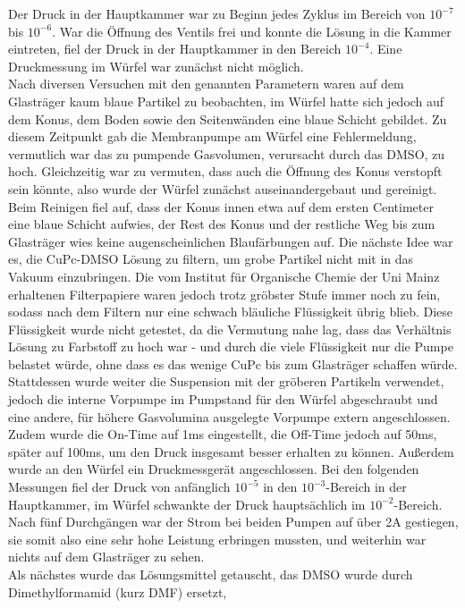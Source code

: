 Der Druck in der Hauptkammer war zu Beginn jedes
Zyklus im Bereich von $10^{-7}$ bis $10^{-6}$.
War die Öffnung des Ventils frei und konnte die
Lösung in die Kammer eintreten, fiel der Druck in
der Hauptkammer in den Bereich $10^{-4}$. Eine
Druckmessung im Würfel war zunächst nicht möglich.\\
Nach diversen Versuchen mit den genannten Parametern waren auf dem Glasträger kaum blaue Partikel zu
beobachten, im Würfel hatte sich jedoch auf dem Konus, dem Boden sowie den Seitenwänden eine blaue Schicht
gebildet. Zu diesem Zeitpunkt gab die Membranpumpe am Würfel eine Fehlermeldung, vermutlich war das
zu pumpende Gasvolumen, verursacht durch das DMSO, zu hoch. Gleichzeitig war zu vermuten, dass auch die
Öffnung des Konus verstopft sein könnte, also wurde der Würfel zunächst auseinandergebaut und gereinigt.\\
Beim Reinigen fiel auf, dass der Konus innen etwa auf dem ersten Centimeter eine blaue Schicht aufwies, der
Rest des Konus und der restliche Weg bis zum Glasträger wies keine augenscheinlichen Blaufärbungen auf. Die
nächste Idee war es, die CuPc-DMSO Lösung zu filtern, um grobe Partikel nicht mit in das Vakuum einzubringen.
Die vom Institut für Organische Chemie der Uni Mainz erhaltenen Filterpapiere waren jedoch  trotz gröbster
Stufe immer noch zu fein, sodass nach dem Filtern nur eine schwach bläuliche Flüssigkeit übrig blieb. Diese
Flüssigkeit wurde nicht getestet, da die Vermutung nahe lag, dass das Verhältnis Lösung zu Farbstoff zu hoch
war - und durch die viele Flüssigkeit nur die Pumpe belastet würde, ohne dass es das wenige CuPc bis zum
Glasträger schaffen würde.\\
Stattdessen wurde weiter die Suspension mit der gröberen Partikeln verwendet, jedoch die interne Vorpumpe im
Pumpstand für den Würfel abgeschraubt und eine andere, für höhere Gasvolumina ausgelegte Vorpumpe extern
angeschlossen. Zudem wurde die On-Time auf 1ms eingestellt, die Off-Time jedoch auf 50ms, später auf 100ms, um
den Druck insgesamt besser erhalten zu können. Außerdem wurde an den Würfel ein Druckmessgerät angeschlossen.
Bei den folgenden Messungen fiel der Druck von anfänglich $10^{-5}$ in den $10^{-3}$-Bereich in der
Hauptkammer, im Würfel schwankte der Druck hauptsächlich im $10^{-2}$-Bereich. Nach fünf Durchgängen war der
Strom bei beiden Pumpen auf über 2A gestiegen, sie somit also eine sehr hohe Leistung erbringen mussten, und
weiterhin war nichts auf dem Glasträger zu sehen.\\
Als nächstes wurde das Lösungsmittel getauscht, das DMSO wurde durch Dimethylformamid (kurz DMF) ersetzt,
